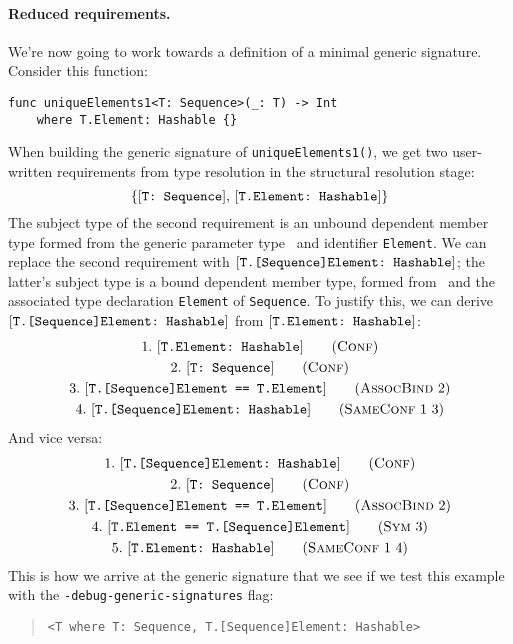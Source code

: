 \documentclass[../generics]{subfiles}
\begin{document}
\paragraph{Reduced requirements.}
We're now going to work towards a definition of a minimal generic signature. Consider this function:
\begin{Verbatim}
func uniqueElements1<T: Sequence>(_: T) -> Int
    where T.Element: Hashable {}
\end{Verbatim}
When building the generic signature of \texttt{uniqueElements1()}, we get two user-written requirements from type resolution in the structural resolution stage:
\[\{[\texttt{T:~Sequence}],\,[\texttt{T.Element:~Hashable}]\}\]
The subject type of the second requirement is an unbound dependent member type formed from the generic parameter type \tT\ and identifier \texttt{Element}. We can replace the second requirement with $[\texttt{T.[Sequence]Element:~Hashable}]$; the latter's subject type is a bound dependent member type, formed from \tT\ and the associated type declaration \texttt{Element} of \texttt{Sequence}. To justify this, we can derive $[\texttt{T.[Sequence]Element:~Hashable}]$ from $[\texttt{T.Element:~Hashable}]$:
\begin{gather*}
\ConfStep{T.Element}{Hashable}{1}\\
\ConfStep{T}{Sequence}{2}\\
\AssocBindStep{2}{T.[Sequence]Element}{T.Element}{3}\\
\SameConfStep{1}{3}{T.[Sequence]Element}{Hashable}{4}
\end{gather*}
And vice versa:
\begin{gather*}
\ConfStep{T.[Sequence]Element}{Hashable}{1}\\
\ConfStep{T}{Sequence}{2}\\
\AssocBindStep{2}{T.[Sequence]Element}{T.Element}{3}\\
\SymStep{3}{T.Element}{T.[Sequence]Element}{4}\\
\SameConfStep{1}{4}{T.Element}{Hashable}{5}
\end{gather*}
This is how we arrive at the generic signature that we see if we test this example with the \texttt{-debug-generic-signatures} flag:
\begin{quote}
\begin{verbatim}
<T where T: Sequence, T.[Sequence]Element: Hashable>
\end{verbatim}
\end{quote}
\end{document}
